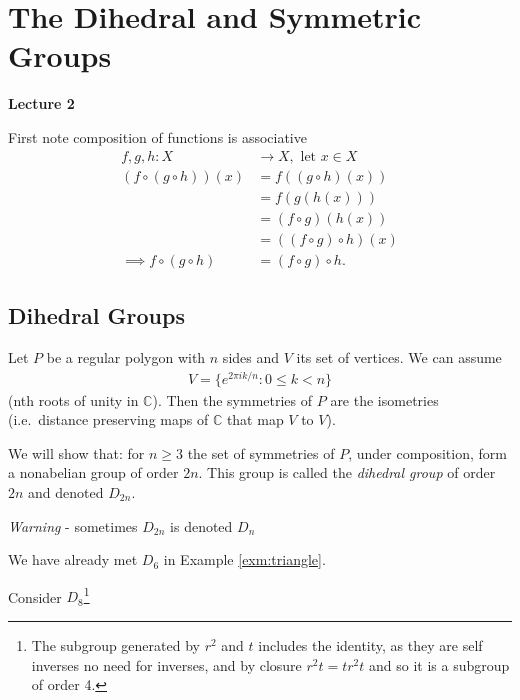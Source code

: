 
\hypertarget{the-dihedral-and-symmetric-groups}{%
\section{The Dihedral and Symmetric Groups}\label{the-dihedral-and-symmetric-groups}}

\textbf{Lecture 2}

First note composition of functions is associative
\begin{align*}
    f, g, h: X &\to X, \text{ let } x \in X \\
    (f \circ (g \circ h))(x) &= f((g \circ h)(x)) \\
    &= f(g(h(x))) \\
    &= (f \circ g)(h(x)) \\
    &= ((f \circ g) \circ h)(x) \\
    \implies f \circ (g \circ h) &= (f \circ g) \circ h.
\end{align*}

\hypertarget{dihedral-groups}{%
\subsection{Dihedral Groups}\label{dihedral-groups}}

Let \(P\) be a regular polygon with \(n\) sides and \(V\) its set of vertices.
We can assume
\begin{align*}
    V = \{ e^{2\pi i k /n} : 0 \leq k < n \}   
\end{align*} (nth roots of unity in \(\mathbb{C}\)).
Then the symmetries of \(P\) are the isometries (i.e.~distance preserving maps of \(\mathbb{C}\) that map \(V\) to \(V\)).

We will show that:
for \(n \geq 3\) the set of symmetries of \(P\), under composition, form a nonabelian group of order \(2n\). This group is called the \emph{dihedral group} of order \(2n\) and denoted \(D_{2n}\).

\emph{Warning} - sometimes \(D_{2n}\) is denoted \(D_n\)

We have already met \(D_6\) in Example \ref{exm:triangle}.

Consider \(D_8\)\footnote{The subgroup generated by \(r^2\) and \(t\) includes the identity, as they are self inverses no need for inverses, and by closure \(r^2t = tr^2t\) and so it is a subgroup of order 4.}

